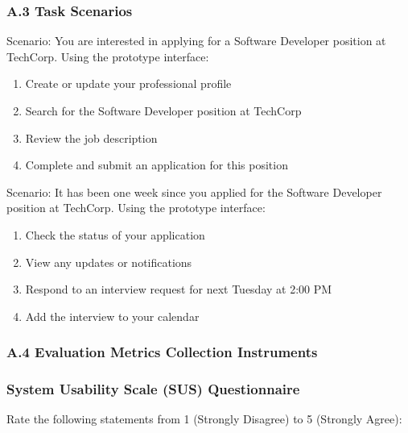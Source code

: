 \documentclass[
	letterpaper, %
]{jdf}
\begin{document}
\subsubsection{A.3 Task Scenarios}


Scenario: You are interested in applying for a Software Developer position at TechCorp. Using the prototype interface:

\begin{enumerate}
    \item Create or update your professional profile
    \item Search for the Software Developer position at TechCorp
    \item Review the job description
    \item Complete and submit an application for this position
\end{enumerate}


Scenario: It has been one week since you applied for the Software Developer position at TechCorp. Using the prototype interface:

\begin{enumerate}
    \item Check the status of your application
    \item View any updates or notifications
    \item Respond to an interview request for next Tuesday at 2:00 PM
    \item Add the interview to your calendar
\end{enumerate}

\subsubsection{A.4 Evaluation Metrics Collection Instruments}

\subsubsection{System Usability Scale (SUS) Questionnaire}

Rate the following statements from 1 (Strongly Disagree) to 5 (Strongly Agree):
\end{document}
